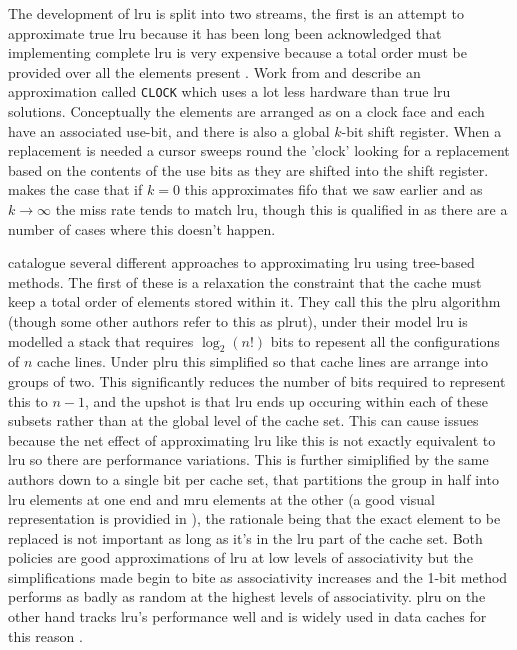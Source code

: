 The development of \gls{lru} is split into two streams, the first is an attempt to approximate true \gls{lru} because it has been long been acknowledged that implementing complete \gls{lru} is very expensive because a total order must be provided over all the elements present \cite{soCacheOperationsMRU1988}. Work from \citet{corbatoPagingExperimentMultics1969} and \citet{eastonUseBitScanning1979} describe an approximation called \texttt{CLOCK} which uses a lot less hardware than true \gls{lru} solutions. Conceptually the elements are arranged as on a clock face and each have an associated use-bit, and there is also a global $k$-bit shift register. When a replacement is needed a cursor sweeps round the 'clock' looking for a replacement based on the contents of the use bits as they are shifted into the shift register. \citet{corbatoPagingExperimentMultics1969} makes the case that if $k=0$ this approximates \gls{fifo} that we saw earlier and as $k \rightarrow \infty$ the miss rate tends to match \gls{lru}, though this is qualified in \citet{eastonUseBitScanning1979} as there are a number of cases where this doesn't happen. 

\citet{soCacheOperationsMRU1988} catalogue several different approaches to approximating \gls{lru} using tree-based methods. The first of these is a relaxation the constraint that the cache must keep a total order of elements stored within it. They call this the \gls{plru} algorithm (though some other authors refer to this as \gls{plrut}), under their model \gls{lru} is modelled a stack that requires $\log_2(n!)$ bits to repesent all the configurations of $n$ cache lines. Under \gls{plru} this simplified so that cache lines are arrange into groups of two. This significantly reduces the number of bits required to represent this to $n-1$, and the upshot is that \gls{lru} ends up occuring within each of these subsets rather than at the global level of the cache set. This can cause issues because the net effect of approximating \gls{lru} like this is not exactly equivalent to \gls{lru} so there are performance variations. This is further simiplified by the same authors down to a single bit per cache set, that partitions the group in half into \gls{lru} elements at one end and \gls{mru} elements at the other (a good visual representation is providied in \cite{damienStudyDifferentCache2007}), the rationale being that the exact element to be replaced is not important as long as it's in the \gls{lru} part of the cache set. Both policies are good approximations of \gls{lru} at low levels of associativity but the simplifications made begin to bite as associativity increases and the 1-bit method performs as badly as random at the highest levels of associativity. \gls{plru} on the other hand tracks \gls{lru}'s performance well \cite{al-zoubiPerformanceEvaluationCache2004} and is widely used in data caches for this reason \cite{damienStudyDifferentCache2007}.


